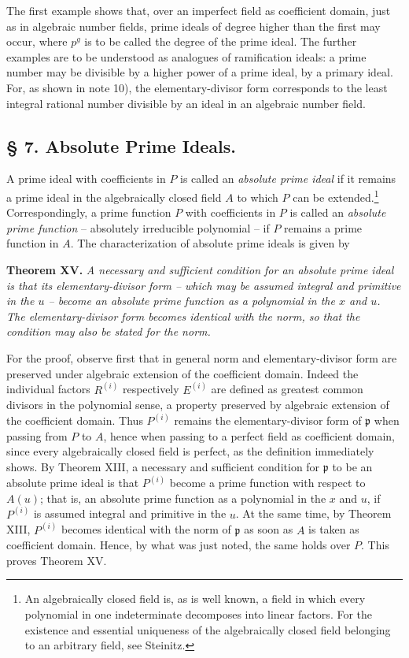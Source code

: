 \documentclass[11pt]{article}
\providecommand{\frakp}{\mathfrak p}
\providecommand{\frakp}{\mathfrak p}
\providecommand{\frakp}{\mathfrak p}
\begin{document}
The first example shows that, over an imperfect field as coefficient domain, just as in algebraic number fields, prime ideals of degree higher than the first may occur, where $p^g$ is to be called the degree of the prime ideal. The further examples are to be understood as analogues of ramification ideals: a prime number may be divisible by a higher power of a prime ideal, by a primary ideal. For, as shown in note 10), the elementary-divisor form corresponds to the least integral rational number divisible by an ideal in an algebraic number field.

\subsection*{§ 7. Absolute Prime Ideals.}

A prime ideal with coefficients in $P$ is called an \emph{absolute prime ideal} if it remains a prime ideal in the algebraically closed field $A$ to which $P$ can be extended.\footnote{An algebraically closed field is, as is well known, a field in which every polynomial in one indeterminate decomposes into linear factors. For the existence and essential uniqueness of the algebraically closed field belonging to an arbitrary field, see Steinitz.} Correspondingly, a prime function $P$ with coefficients in $P$ is called an \emph{absolute prime function} -- absolutely irreducible polynomial -- if $P$ remains a prime function in $A$. The characterization of absolute prime ideals is given by

\textbf{Theorem XV.} \emph{A necessary and sufficient condition for an absolute prime ideal is that its elementary-divisor form -- which may be assumed integral and primitive in the $u$ -- become an absolute prime function as a polynomial in the $x$ and $u$. The elementary-divisor form becomes identical with the norm, so that the condition may also be stated for the norm.}

For the proof, observe first that in general norm and elementary-divisor form are preserved under algebraic extension of the coefficient domain. Indeed the individual factors $R^{(i)}$ respectively $E^{(i)}$ are defined as greatest common divisors in the polynomial sense, a property preserved by algebraic extension of the coefficient domain. Thus $P^{(i)}$ remains the elementary-divisor form of $\frakp$ when passing from $P$ to $A$, hence when passing to a perfect field as coefficient domain, since every algebraically closed field is perfect, as the definition immediately shows. By Theorem XIII, a necessary and sufficient condition for $\frakp$ to be an absolute prime ideal is that $P^{(i)}$ become a prime function with respect to $A(u)$; that is, an absolute prime function as a polynomial in the $x$ and $u$, if $P^{(i)}$ is assumed integral and primitive in the $u$. At the same time, by Theorem XIII, $P^{(i)}$ becomes identical with the norm of $\frakp$ as soon as $A$ is taken as coefficient domain. Hence, by what was just noted, the same holds over $P$. This proves Theorem XV.
\end{document}
